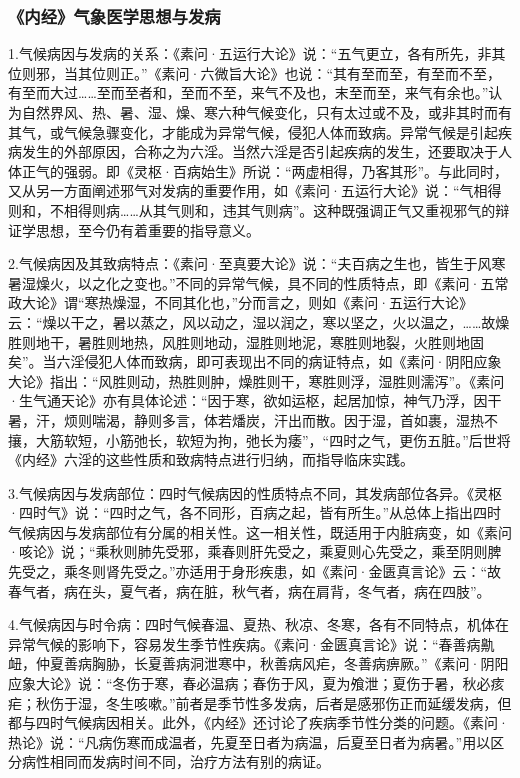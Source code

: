\documentclass[draft,12pt]{ctexbook}
\begin{document}
\subsubsection{《内经》气象医学思想与发病}%

1.气候病因与发病的关系：《素问·五运行大论》说：“五气更立，各有所先，非其位则邪，当其位则正。”《素问·六微旨大论》也说：“其有至而至，有至而不至，有至而大过……至而至者和，至而不至，来气不及也，末至而至，来气有余也。”认为自然界风、热、暑、湿、燥、寒六种气候变化，只有太过或不及，或非其时而有其气，或气候急骤变化，才能成为异常气候，侵犯人体而致病。异常气候是引起疾病发生的外部原因，合称之为六淫。当然六淫是否引起疾病的发生，还要取决于人体正气的强弱。即《灵枢·百病始生》所说：“两虚相得，乃客其形”。与此同时，又从另一方面阐述邪气对发病的重要作用，如《素问·五运行大论》说：“气相得则和，不相得则病……从其气则和，违其气则病”。这种既强调正气又重视邪气的辩证学思想，至今仍有着重要的指导意义。

2.气候病因及其致病特点：《素问·至真要大论》说：“夫百病之生也，皆生于风寒暑湿燥火，以之化之变也。”不同的异常气候，具不同的性质特点，即《素问·五常政大论》谓“寒热燥湿，不同其化也，”分而言之，则如《素问·五运行大论》云：“燥以干之，暑以蒸之，风以动之，湿以润之，寒以坚之，火以温之，……故燥胜则地干，暑胜则地热，风胜则地动，湿胜则地泥，寒胜则地裂，火胜则地固矣”。当六淫侵犯人体而致病，即可表现出不同的病证特点，如《素问·阴阳应象大论》指出：“风胜则动，热胜则肿，燥胜则干，寒胜则浮，湿胜则濡泻”。《素问·生气通天论》亦有具体论述：“因于寒，欲如运枢，起居加惊，神气乃浮，因干暑，汗，烦则喘渴，静则多言，体若燔炭，汗出而散。因于湿，首如裹，湿热不攘，大筋软短，小筋弛长，软短为拘，弛长为痿”，“四时之气，更伤五脏。”后世将《内经》六淫的这些性质和致病特点进行归纳，而指导临床实践。

3.气候病因与发病部位：四时气候病因的性质特点不同，其发病部位各异。《灵枢·四时气》说：“四时之气，各不同形，百病之起，皆有所生。”从总体上指出四时气候病因与发病部位有分属的相关性。这一相关性，既适用于内脏病变，如《素问·咳论》说；“乘秋则肺先受邪，乘春则肝先受之，乘夏则心先受之，乘至阴则脾先受之，乘冬则肾先受之。”亦适用于身形疾患，如《素问·金匮真言论》云：“故春气者，病在头，夏气者，病在脏，秋气者，病在肩背，冬气者，病在四肢”。

4.气候病因与时令病：四时气候春温、夏热、秋凉、冬寒，各有不同特点，机体在异常气候的影响下，容易发生季节性疾病。《素问·金匮真言论》说：“春善病鼽衄，仲夏善病胸胁，长夏善病洞泄寒中，秋善病风疟，冬善病痹厥。”《素问·阴阳应象大论》说：“冬伤于寒，春必温病；春伤于风，夏为飧泄；夏伤于暑，秋必痎疟；秋伤于湿，冬生咳嗽。”前者是季节性多发病，后者是感邪伤正而延缓发病，但都与四时气候病因相关。此外，《内经》还讨论了疾病季节性分类的问题。《素问·热论》说：“凡病伤寒而成温者，先夏至日者为病温，后夏至日者为病暑。”用以区分病性相同而发病时间不同，治疗方法有别的病证。
\end{document}
